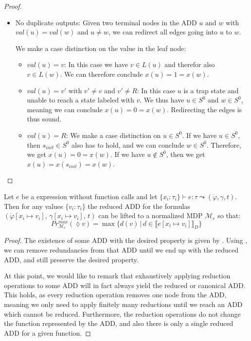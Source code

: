 \begin{proof}
\begin{itemize}
		In the nondeterministic case, we get the equations $x(u) = \max\{x(\mathit{then}(u)),\; x(\mathit{else}(u))\}$ and $x(w) = \max\{x(\mathit{then}(u)),\; x(\mathit{else}(u))\}$.  
		Once again both states adhere to the same equation. \\
		
		
		\item No duplicate outputs: Given two terminal nodes in the ADD  $u$ and $w$ with $val(u) = val(w)$ and $u \neq w$, we can redirect all edges going into $u$ to $w$.
		
		We make a case distinction on the value in the leaf node:
		\begin{itemize}
			\item $val(u) = v$: In this case we have $v \in L(u)$ and therefor also $v \in L(w)$.
			We can therefore conclude $x(u) = 1 = x(w)$.
			\item $val(u) = v'$ with $v' \neq v$ and $v' \neq R$: In this case $u$ is a trap state and unable to reach a state labeled with $v$.
			We thus have $u \in S^0$ and $w \in S^0$, meaning we can conclude $x(u) = 0 = x(w)$.
			Redirecting the edges is thus sound.
			\item $val(u) = R$: We make a case distinction on $u \in S^0$.
			If we have $u \in S^0$, then $s_{init} \in S^0$ also has to hold, and we can conclude $w \in S^0$.
			Therefore, we get $x(u) = 0 = x(w)$.
			If we have $u\notin S^0$, then we get $x(u) = x(s_{init}) = x(w)$.
		\end{itemize}
		
	\end{itemize}
\end{proof}


\begin{theorem}\label{SoundnessTheoremProof}
	Let $e$ be a \NDICE expression without function calls 
	and let $\{x_i\colon \tau_i\} \vdash e \colon \tau \leadsto (\dot{\varphi}, \gamma, t)$. Then for any values $\{v_i\colon \tau_i\}$ the  reduced ADD for the formulas $(\dot{\varphi}[x_i\mapsto v_i],\, \gamma[x_i\mapsto v_i],\, t)$ can be lifted to a normalized MDP $\mathcal{M}_e$ so that:
	$$ Pr^{max}_{\mathcal{M}_e} (\lozenge v) = \max \{d(v) \,|\, d \in \llbracket e[x_i\mapsto v_i]\rrbracket_D\}$$
\end{theorem}
\begin{proof}
	The existence of some ADD with the desired property is given by . 
	Using , we can remove redundancies from that ADD until we end up with the reduced ADD, and still preserve the desired property.
	
	At this point, we would like to remark that exhaustively applying reduction operations to some ADD will in fact always yield the reduced or canonical ADD.
	This holds, as every reduction operation removes one node from the ADD, meaning we only need to apply finitely many reductions until we reach an ADD which cannot be reduced.
	Furthermore, the reduction operations do not change the function represented by the ADD, and also there is only a single reduced ADD for a given function.
\end{proof}


